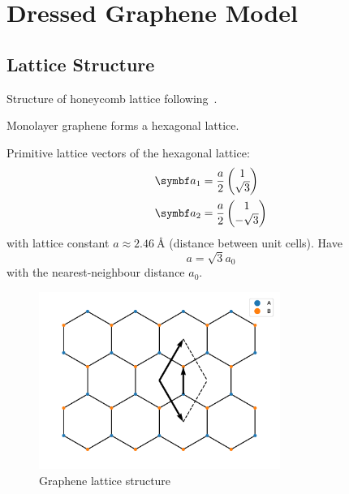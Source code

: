 \documentclass[../notes.tex]{subfiles}
\begin{document}
	
\chapter{Dressed Graphene Model}	

\section{Lattice Structure}\label{sec:lattice-structure-of-graphene}

Structure of honeycomb lattice following~\cite{yangStructureGrapheneIts2018}.

Monolayer graphene forms a hexagonal lattice.

Primitive lattice vectors of the hexagonal lattice:
\begin{align}
	\vb{a}_1 &= \frac{a}{2} \begin{pmatrix} 1 \\ \sqrt{3} \end{pmatrix} \\
	\vb{a}_2 &= \frac{a}{2} \begin{pmatrix} 1 \\ -\sqrt{3} \end{pmatrix}
\end{align}
with lattice constant \(a \approx \SI{2.46}{\angstrom}\) (distance between unit cells).
Have
\begin{equation}
	a = \sqrt{3} a_0
\end{equation}
with the nearest-neighbour distance \(a_0\).

\begin{figure}[htb]
	\centering
	\includegraphics[width=0.7\textwidth]{images/graphene lattice}
	\caption{Graphene lattice structure}
	\label{fig:graphene lattice structure}
\end{figure}
\end{document}
